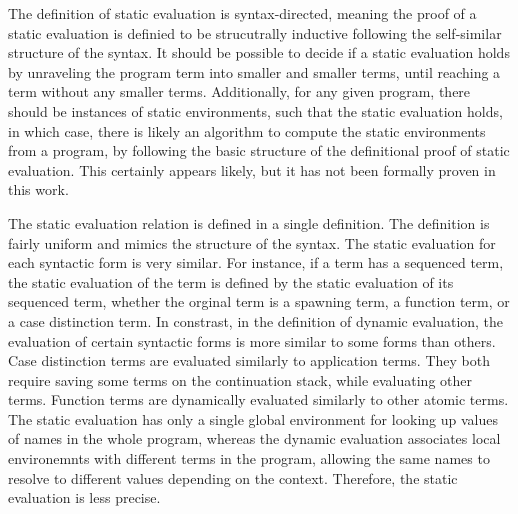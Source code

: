 \documentclass[letterpaper, 11pt]{extarticle}
\begin{document}
The definition of static evaluation is syntax-directed, meaning the proof of a static evaluation
is definied to be strucutrally inductive following the self-similar structure of the syntax.
It should be possible to decide if a static evaluation holds
by unraveling the program term into smaller and smaller terms,
until reaching a term without any smaller terms.
Additionally, for any given program, there should be instances of static environments,
such that the static evaluation holds, in which case,
there is likely an algorithm to compute the static environments from a program,
by following the basic structure of the definitional proof of static evaluation.
This certainly appears likely, but it has not been formally proven in this work.

The static evaluation relation is defined in a single definition.
The definition is fairly uniform and mimics the structure of the syntax.
The static evaluation for each syntactic form is very similar.
For instance, if a term has a sequenced term,
the static evaluation of the term is defined
by the static evaluation of its sequenced term,
whether the orginal term is a spawning term, a function term, or a case distinction term.
In constrast, in the definition of dynamic evaluation,
the evaluation of certain syntactic forms is more similar to some forms than others.
Case distinction terms are evaluated similarly to application terms. They both require
saving some terms on the continuation stack, while evaluating other terms.
Function terms are dynamically evaluated similarly to other atomic terms.
The static evaluation has only a single global environment for
looking up values of names in the whole program, whereas the dynamic evaluation
associates local environemnts with different terms in the program, allowing the same
names to resolve to different values depending on the context. Therefore, the
static evaluation is less precise.
\end{document}
